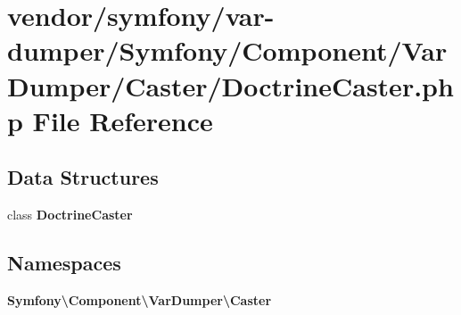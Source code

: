 \section{vendor/symfony/var-\/dumper/\+Symfony/\+Component/\+Var\+Dumper/\+Caster/\+Doctrine\+Caster.php File Reference}
\label{_doctrine_caster_8php}
\subsection*{Data Structures}
\begin{DoxyCompactItemize}
\item 
class {\bf Doctrine\+Caster}
\end{DoxyCompactItemize}
\subsection*{Namespaces}
\begin{DoxyCompactItemize}
\item 
 {\bf Symfony\textbackslash{}\+Component\textbackslash{}\+Var\+Dumper\textbackslash{}\+Caster}
\end{DoxyCompactItemize}
